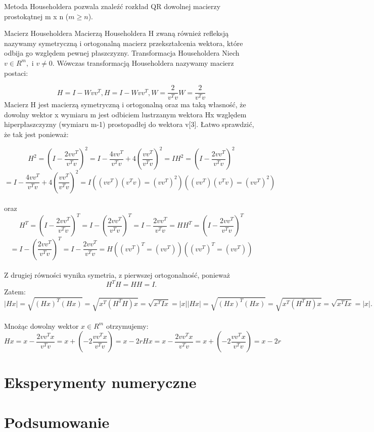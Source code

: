 \documentclass[10pt,a4paper]{report}
\begin{document}
Metoda Householdera pozwala znaleźć rozkład QR dowolnej macierzy prostokątnej m x n ($m\ge n$).

{Macierz Householdera}
Macierzą Householdera H zwaną również refleksją nazywamy symetryczną i ortogonalną macierz przekształcenia wektora, które odbija go względem pewnej płaszczyzny. 
\newpage
{Transformacja Householdera}
Niech  $v\in R^{m}, $ i $v\neq 0. $ Wówczas transformacją Householdera nazywamy macierz postaci:

$${\displaystyle H=I-Wvv^{T}, } {\displaystyle H=I-Wvv^{T}, }       {\displaystyle W={\frac {2}{v^{T}v}}} {\displaystyle W={\frac {2}{v^{T}v}}}$$ 
Macierz H jest macierzą symetryczną i ortogonalną oraz ma taką własność, że dowolny wektor x wymiaru m jest odbiciem lustrzanym wektora Hx względem hiperpłaszczyzny (wymiaru m-1) prostopadłej do wektora v[3]. Łatwo sprawdzić, że tak jest ponieważ: 

$${\displaystyle H^{2}=\left(I-{\frac {2vv^{T}}{v^{T}v}}\right)^{2}=I-{\frac {4vv^{T}}{v^{T}v}}+4\left({\frac {vv^{T}}{v^{T}v}}\right)^{2}=I} {\displaystyle H^{2}=\left(I-{\frac {2vv^{T}}{v^{T}v}}\right)^{2}}$$ \newline  $$= {I-{\frac {4vv^{T}}{v^{T}v}}+4\left({\frac {vv^{T}}{v^{T}v}}\right)^{2}=I}       {\displaystyle ((vv^{T})(v^{T}v)=(vv^{T})^{2})} {\displaystyle ((vv^{T})(v^{T}v)=(vv^{T})^{2})}$$\\
oraz\\

$${\displaystyle H^{T}=\left(I-{\frac {2vv^{T}}{v^{T}v}}\right)^{T}=I-\left({\frac {2vv^{T}}{v^{T}v}}\right)^{T}=I-{\frac {2vv^{T}}{v^{T}v}}=H} {\displaystyle H^{T}=\left(I-{\frac {2vv^{T}}{v^{T}v}}\right)^{T}}$$ \newline $$={I-\left({\frac {2vv^{T}}{v^{T}v}}\right)^{T}=I-{\frac {2vv^{T}}{v^{T}v}}=H}       {\displaystyle ((vv^{T})^{T}=(vv^{T}))} {\displaystyle ((vv^{T})^{T}=(vv^{T}))}$$\\
Z drugiej równości wynika symetria, z pierwszej ortogonalność, ponieważ $${\displaystyle H^{T}H=HH=I}. $$ Zatem:\\

$${\displaystyle |Hx|={\sqrt {(Hx)^{T}(Hx)}}={\sqrt {x^{T}(H^{T}H)x}}={\sqrt {x^{T}Ix}}=|x|} {\displaystyle |Hx|={\sqrt {(Hx)^{T}(Hx)}}={\sqrt {x^{T}(H^{T}H)x}}={\sqrt {x^{T}Ix}}=|x|}. $$\\
Mnożąc dowolny wektor ${\displaystyle x\in R^{m}}$ otrzymujemy:\\

$${\displaystyle Hx=x-{\frac {2vv^{T}x}{v^{T}v}}=x+(-2{\frac {vv^{T}x}{v^{T}v}})=x-2r} {\displaystyle Hx=x-{\frac {2vv^{T}x}{v^{T}v}}=x+(-2{\frac {vv^{T}x}{v^{T}v}})=x-2r}$$





\chapter{Eksperymenty numeryczne}

\chapter{Podsumowanie}




\end{document}

